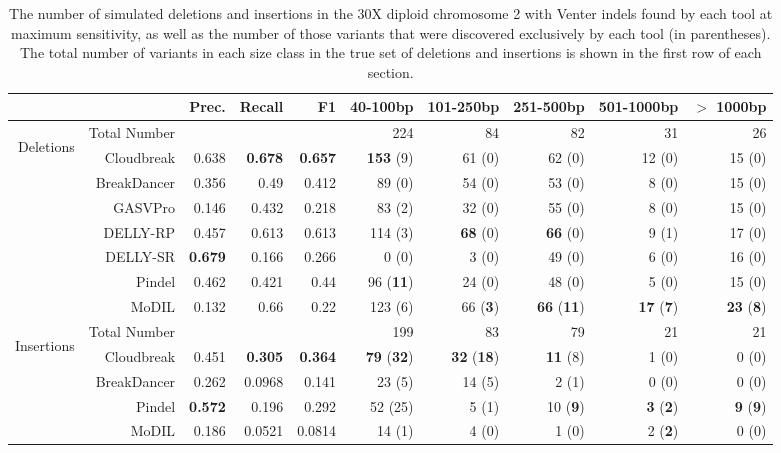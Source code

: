 \documentclass{bioinfo}
\begin{document}
\begin{table}[b]
\begin{center}
\footnotesize
\begin{tabular}{r|rrrr|rrrrr}
  \cline{2-10}
   &                     & Prec. & Recall & F1 & 40-100bp  & 101-250bp  & 251-500bp & 501-1000bp & $>$ 1000bp \\ 
\hline
\multirow{7}{*}{\begin{sideways}Deletions\end{sideways}} & Total Number &          &           &  &  224 &  84 & 82 &  31 & 26\\ 
  \hline
\cline{2-10}
&  Cloudbreak    &  0.638 & \textbf{0.678} & \textbf{0.657} & \textbf{153} (9)  & 61 (0) &  62 (0) & 12 (0) & 15 (0) \\ 
&  BreakDancer   &  0.356 & 0.49 & 0.412 & 89 (0)  & 54 (0) &  53 (0) & 8 (0) & 15 (0) \\ 
&  GASVPro        & 0.146 & 0.432 & 0.218 & 83 (2)  & 32 (0) &  55 (0) & 8 (0) & 15 (0) \\ 
&  DELLY-RP           & 0.457 & 0.613 & 0.613 & 114 (3)  & \textbf{68} (0) &  \textbf{66} (0) & 9 (1) & 17 (0) \\ 
&  DELLY-SR           & \textbf{0.679} & 0.166 &  0.266 & 0 (0)  & 3 (0) &  49 (0) & 6 (0) & 16 (0) \\ 
&  Pindel           & 0.462 & 0.421 &  0.44 & 96 (\textbf{11})  & 24 (0) &  48 (0) & 5 (0) & 15 (0)\\ 
&  MoDIL           & 0.132  & 0.66 & 0.22 & 123 (6)  & 66 (\textbf{3}) &  \textbf{66} (\textbf{11}) & \textbf{17} (\textbf{7}) & \textbf{23} (\textbf{8})\\ 
   \hline
\multirow{5}{*}{\begin{sideways}Insertions\end{sideways}} & Total Number &          &           & & 199 &  83 & 79 &  21 & 21\\ 
\cline{2-10}
&  Cloudbreak   &0.451 & \textbf{0.305}  & \textbf{0.364}  & \textbf{79} (\textbf{32})  & \textbf{32} (\textbf{18}) &  \textbf{11} (8) & 1 (0) & 0 (0) \\ 
&  BreakDancer & 0.262 & 0.0968  & 0.141  & 23 (5)  & 14 (5) &  2 (1) & 0 (0) & 0 (0) \\ 
&  Pindel          & \textbf{0.572} & 0.196 &  0.292 & 52 (25)  & 5 (1) &  10 (\textbf{9}) & \textbf{3} (\textbf{2}) & \textbf{9} (\textbf{9})\\ 
&  MoDIL          & 0.186 & 0.0521 &  0.0814 & 14 (1)  & 4 (0) &  1 (0) & 2 (\textbf{2}) & 0 (0)\\ 
\hline
\end{tabular}
\end{center}
\caption{The number of simulated deletions and insertions in the 30X diploid chromosome 2 with Venter indels found by each tool at maximum sensitivity, as well as the number of those variants that were discovered exclusively by each tool (in parentheses). The total number of variants in each size class in the true set of deletions and insertions is shown in the first row of each section.}
\label{chr2DeletionAndInsertionPredsMaxSensitivity}
\end{table}
\end{document}
